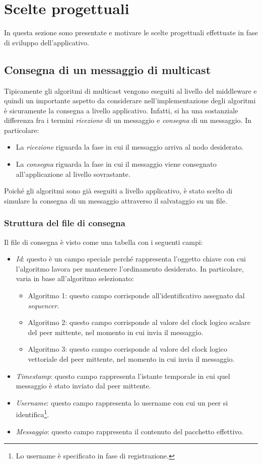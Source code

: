 \documentclass[acmtog]{acmart}
\begin{document}
\section{Scelte progettuali}
In questa sezione sono presentate e motivare le scelte progettuali effettuate in fase di sviluppo dell'applicativo.

\subsection{Consegna di un messaggio di multicast}
Tipicamente gli algoritmi di multicast vengono eseguiti al livello del middleware e quindi un importante aspetto da considerare nell'implementazione degli algoritmi è sicuramente la consegna a livello applicativo. Infatti, si ha una sostanziale differenza fra i termini \textit{ricezione} di un messaggio e \textit{consegna} di un messaggio. In particolare:
\begin{itemize}
\item La \textit{ricezione} riguarda la fase in cui il messaggio arriva al nodo desiderato. 
\item La \textit{consegna} riguarda la fase in cui il messaggio viene consegnato all'applicazione al livello sovrastante.
\end{itemize}

Poiché gli algoritmi sono già eseguiti a livello applicativo, è stato scelto di simulare la consegna di un messaggio attraverso il salvataggio su un file. 

\subsubsection{Struttura del file di consegna} Il file di consegna è visto come una tabella con i seguenti campi:
\begin{itemize}
\item \textit{Id}: questo è un campo speciale perché rappresenta l'oggetto chiave con cui l'algoritmo lavora per mantenere l'ordinamento desiderato. In particolare, varia in base all'algoritmo selezionato:
\begin{itemize}
\item Algoritmo 1: questo campo corrisponde all'identificativo assegnato dal \textit{sequencer}.
\item Algoritmo 2: questo campo corrisponde al valore del clock logico scalare del peer mittente, nel momento in cui invia il messaggio.
\item Algoritmo 3: questo campo corrisponde al valore del clock logico vettoriale del peer mittente, nel momento in cui invia il messaggio.
\end{itemize}
\item \textit{Timestamp}: questo campo rappresenta l'istante temporale in cui quel messaggio è stato inviato dal peer mittente.
\item \textit{Username}: questo campo rappresenta lo username con cui un peer si identifica\footnote{Lo username è specificato in fase di registrazione.}.
\item \textit{Messaggio}: questo campo rappresenta il contenuto del pacchetto effettivo.
\end{itemize}
\end{document}

